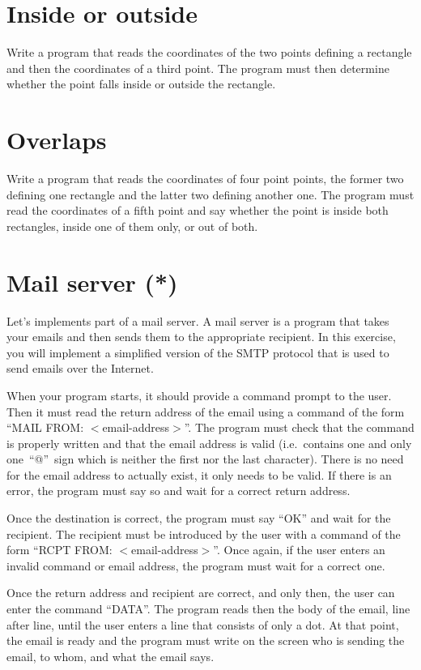 \documentclass{article}
\begin{document}
\section{Inside or outside}
\label{sec:inside-or-outside}

Write a program that reads the coordinates of the two points defining a
rectangle and then the coordinates of a third point. The program must
then determine whether the point falls inside or outside the
rectangle. 

\section{Overlaps}
\label{sec:insideinside}

Write a program that reads the coordinates of four point points, the
former two defining one rectangle and the latter two defining
another one. The program must read the coordinates of a fifth point and
say whether the point is inside both rectangles, inside one of them
only, or out of both. 


\section{Mail server (*)}
\label{sec:mail-server}

Let's implements part of a mail server. A mail server is a program
that takes your emails and then sends them to the appropriate
recipient. In this exercise, you will implement a simplified version
of the SMTP protocol that is used to send emails over the Internet. 

When your program starts, it should provide a command prompt to the
user. Then it must read the return address of the email using a
command of the form ``MAIL FROM: $<$email-address$>$''. The program
must check that the command is properly written and that the email
address is valid (i.e.~contains one and only one~``@''~sign 
which is neither the
first nor the last character). There is no need for the email address
to actually exist, it only needs to be valid. If there is an error,
the program must 
say so and wait for a correct return address.

Once the destination is correct, the program must say ``OK'' and wait
for the recipient. The recipient must be introduced by the user with a
command of the form ``RCPT FROM: $<$email-address$>$''. Once again, if
the user enters an invalid command or email address, the program must
wait for a correct one. 

Once the return address and recipient are correct, and only then, the
user can enter the command ``DATA''. The program reads then the body
of the email, line after line, until the user enters a line that
consists of only a dot. At that point, the email is ready and the
program must write on the screen who is sending the email, to whom,
and what the email says. 
\end{document}
